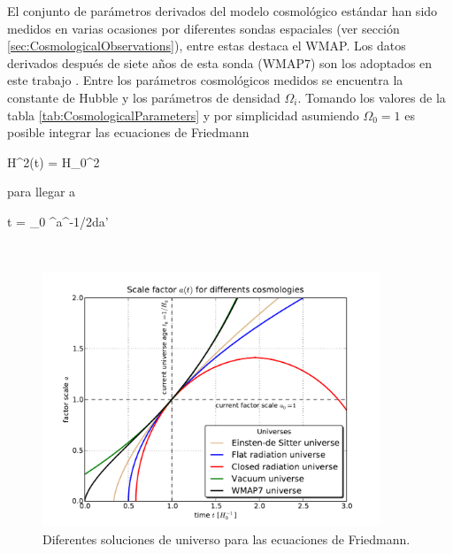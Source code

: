El conjunto de parámetros derivados del modelo cosmológico estándar han 
sido medidos en varias ocasiones por diferentes sondas espaciales (ver 
sección \ref{sec:CosmologicalObservations}), entre estas destaca el WMAP. 
Los datos derivados después de siete años de esta sonda (WMAP7) son los 
adoptados en este trabajo \cite{WMAP7}. Entre los parámetros cosmológicos 
medidos se encuentra la constante de Hubble y los parámetros de densidad 
$\Omega_i$. Tomando los valores de la tabla \ref{tab:CosmologicalParameters} 
y por simplicidad asumiendo $\Omega_0 = 1$ es posible integrar las 
ecuaciones de Friedmann


{ H^2(t) = H_0^2  }


para llegar a


{ t = \int _0 ^{a}^{-1/2}da' }

\
\begin{figure}[htbp]
	\centering
	\includegraphics[width=0.9\textwidth]
	{./figures/2_theoretical_framework/Friedmann_Solution.pdf}

	\caption{\small{Diferentes soluciones de universo para las ecuaciones
	de Friedmann.}}
	
	\label{fig:Cosmologies}
\end{figure}
\

